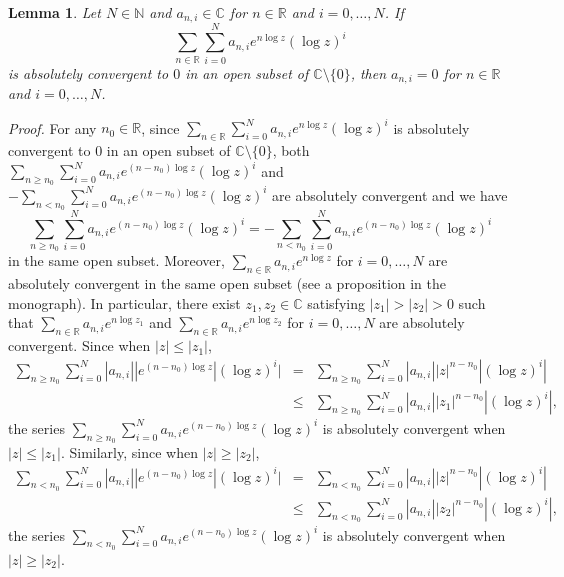 \documentclass[12pt]{article}
\newtheorem{lemma}[thm]{Lemma}
\newcommand{\nn}{\nonumber \\}
\newcommand{\pf}{{\it Proof.}\hspace{2ex}}
\newcommand{\C}{\mathbb{C}}
\newcommand{\R}{\mathbb{R}}
\newcommand{\N}{\mathbb{N}}
\begin{document}
\begin{lemma}
Let $N\in \N$ and $a_{n, i}\in \C$ for $n\in \R$ and $i=0, \dots, N$.
If 
\[
\sum_{n\in \R}\sum_{i=0}^{N}a_{n, i}e^{n\log z}(\log z)^{i}
\]
is absolutely convergent to $0$ in an open subset of $\C\setminus \{0\}$,
then $a_{n, i}=0$ for $n\in \R$ and $i=0, \dots, N$.
\end{lemma}
\pf
For any $n_{0}\in \R$, since $\sum_{n\in \R}\sum_{i=0}^{N}
a_{n, i}e^{n\log z}(\log z)^{i}$
is absolutely convergent to $0$ in an open subset of $\C\setminus \{0\}$,
both $\sum_{n\ge n_{0}}\sum_{i=0}^{N}a_{n, i}e^{(n-n_{0})\log z}(\log z)^{i}$
and $-\sum_{n< n_{0}}\sum_{i=0}^{N}a_{n, i}e^{(n-n_{0})\log z}(\log z)^{i}$
are absolutely convergent and we have
\begin{equation}\label{r-n-1}
\sum_{n\ge n_{0}}\sum_{i=0}^{N}a_{n, i}e^{(n-n_{0})\log z}(\log z)^{i}
=-\sum_{n< n_{0}}\sum_{i=0}^{N}a_{n, i}e^{(n-n_{0})\log z}(\log z)^{i}
\end{equation}
in the same open subset. Moreover, 
$\sum_{n\in \R}a_{n, i}e^{n\log z}$ for $i=0, \dots, N$ are 
absolutely convergent in the same open subset (see a proposition in the 
monograph). In particular, there exist
$z_{1}, z_{2}\in \C$ satisfying $|z_{1}|>|z_{2}|>0$ such that 
$\sum_{n\in \R}a_{n, i}e^{n\log z_{1}}$ and 
$\sum_{n\in \R}a_{n, i}e^{n\log z_{2}}$ for $i=0, \dots, N$
are absolutely convergent. Since when $|z|\le |z_{1}|$,
\begin{eqnarray*}
\sum_{n\ge n_{0}}\sum_{i=0}^{N}|a_{n, i}||e^{(n-n_{0})\log z}|(\log z)^{i}|
&= &\sum_{n\ge n_{0}}\sum_{i=0}^{N}|a_{n, i}||z|^{n-n_{0}}|(\log z)^{i}|\nn
&\le &\sum_{n\ge n_{0}}\sum_{i=0}^{N}|a_{n, i}||z_{1}|^{n-n_{0}}|(\log z)^{i}|,
\end{eqnarray*}
the series 
$\sum_{n\ge n_{0}}\sum_{i=0}^{N}a_{n, i}e^{(n-n_{0})\log z}(\log z)^{i}$
is absolutely convergent when $|z|\le |z_{1}|$.
Similarly, since when $|z|\ge |z_{2}|$,
\begin{eqnarray*}
\sum_{n< n_{0}}\sum_{i=0}^{N}|a_{n, i}||e^{(n-n_{0})\log z}|(\log z)^{i}|
&= &\sum_{n< n_{0}}\sum_{i=0}^{N}|a_{n, i}||z|^{n-n_{0}}|(\log z)^{i}|\nn
&\le &\sum_{n< n_{0}}\sum_{i=0}^{N}|a_{n, i}||z_{2}|^{n-n_{0}}|(\log z)^{i}|,
\end{eqnarray*}
the series 
$\sum_{n< n_{0}}\sum_{i=0}^{N}a_{n, i}e^{(n-n_{0})\log z}(\log z)^{i}$
is absolutely convergent when $|z|\ge |z_{2}|$.
\end{document}
